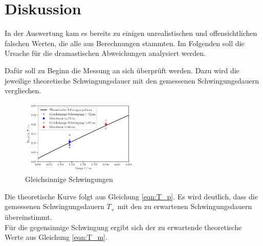 \section{Diskussion}
\label{sec:Diskussion}

In der Auswertung kam es bereits zu einigen unrealistischen und offensichtlichen
falschen Werten, die alle aus Berechnungen stammten.
Im Folgenden soll die Ursache für die dramastischen Abweichungen analysiert werden.


Dafür soll zu Beginn die Messung an sich überprüft werden.
Dazu wird die jeweilige theoretische Schwingungsdauer mit den gemessenen Schwingungsdauern vergliechen.
\begin{figure}
    \centering
    \includegraphics[width=0.5\textwidth]{plots/plot1.pdf}
    \caption{Gleichsinnige Schwingungen}
\end{figure}
Die theoretische Kurve folgt aus Gleichung \ref{eqn:T_p}. Es wird deutlich, dass die gemessenen
Schwingungsdauern $T_+$ mit den zu erwartenen Schwingungsdauern übereinstimmt.\\

Für die gegensinnige Schwingung ergibt sich der zu erwartende theoretische Werte aus Gleichung \ref{eqn:T_m}.

